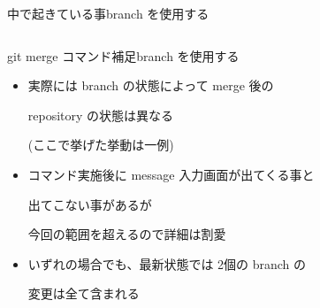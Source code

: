 \begin{frame}[t]{中で起きている事}{branch を使用する}
\begin{columns}
\begin{widecolumn}
    \end{widecolumn}

  \end{columns}
  \vspace{2ex}



\end{frame}


\begin{frame}[t]{git merge コマンド補足}{branch を使用する}

  \begin{itemize}
  \item 実際には branch の状態によって merge 後の

    repository の状態は異なる

    (ここで挙げた挙動は一例)
    \vspace{2ex}

  \item コマンド実施後に message 入力画面が出てくる事と

    出てこない事があるが

    今回の範囲を超えるので詳細は割愛
    \vspace{2ex}

  \item いずれの場合でも、最新状態では 2個の branch の

    変更は全て含まれる
  \end{itemize}

\end{frame}
